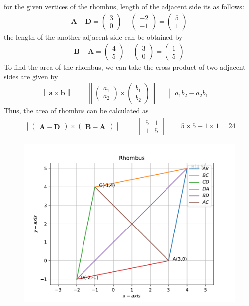\documentclass[12pt]{article}
\newcommand{\mydet}[1]{\ensuremath{\begin{vmatrix}#1\end{vmatrix}}}
\providecommand{\norm}[1]{\left\lVert#1\right\rVert}
\newcommand{\myvec}[1]{\ensuremath{\begin{pmatrix}#1\end{pmatrix}}}
\let\vec\mathbf
\begin{document}
\begin{enumerate}
for the given vertices of the rhombus, length of the adjacent side its as follows:
\begin{align}
 \vec{A-D}= \myvec{3 \\ 0} - \myvec{-2 \\-1}= \myvec{5\\1}
\end{align}
the length of the another adjacent side can be obtained by
\begin{align}
  \vec{B-A}= \myvec{4 \\ 5} - \myvec{3 \\0}= \myvec{1\\5}
\end{align}
To find the area of the rhombus, we can take the cross product of two adjacent sides are given by
\begin{align}
    \norm{\vec{a}\times \vec{b}} &=\norm{\myvec{a_1\\a_2} \times \myvec{b_1\\b_2}} =  \mydet{a_1 b_2 - a_2 b_1}
\end{align}
Thus, the area of rhombus can be calculated as
\begin{align}
                \norm{\myvec{\vec{A-D}}\times \myvec{\vec{B-A}}}&=\mydet{5 & 1\\1 & 5} &= 5 \times 5 - 1 \times 1 = 24
\end{align}
\begin{figure}[!h]
 \begin{center}
  \includegraphics[width=\columnwidth]{figs/fig.pdf}
 \end{center}
\caption{}
\label{fig:Fig1}
\end{figure}
\end{enumerate}
\end{document}
